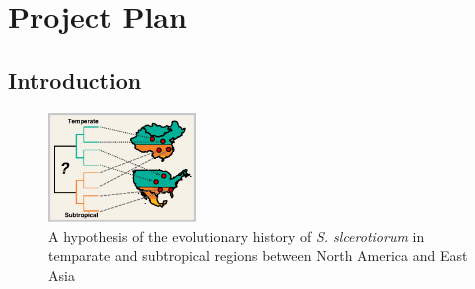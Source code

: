 \documentclass[12pt,letterpaper]{article}
\begin{document}
\section{Project Plan}


\subsection{Introduction}




\begin{figure} %
  \includegraphics[width=0.35\textwidth]{figure/us-china.pdf}
  \caption{A hypothesis of the evolutionary history of \textit{S. slcerotiorum} in temparate and subtropical regions between North America and East Asia}
  \label{fig:us-china}
\end{figure}
\end{document}
